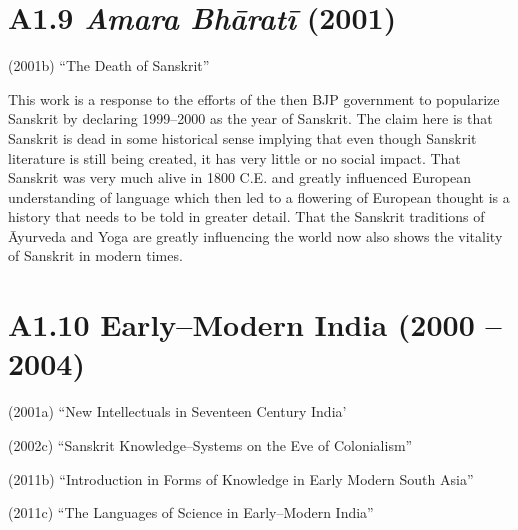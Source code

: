 \section*{A1.9 \textit{Amara Bhāratī} (2001)}

(2001b) “The Death of Sanskrit”

This work is a response to the efforts of the then BJP government to popularize Sanskrit by declaring 1999–2000 as the year of Sanskrit. The claim here is that Sanskrit is dead in some historical sense implying that even though Sanskrit literature is still being created, it has very little or no social impact. That Sanskrit was very much alive in 1800 C.E. and greatly influenced European understanding of language which then led to a flowering of European thought is a history that needs to be told in greater detail. That the Sanskrit traditions of Āyurveda and Yoga are greatly influencing the world now also shows the vitality of Sanskrit in modern times.


\section*{A1.10 Early–Modern India (2000 – 2004)}

\item (2001a) “New Intellectuals in Seventeen Century India’

 \item (2002c) “Sanskrit Knowledge–Systems on the Eve of Colonialism”

 \item (2011b) “Introduction in Forms of Knowledge in Early Modern South Asia”

 \item (2011c) “The Languages of Science in Early–Modern India”

